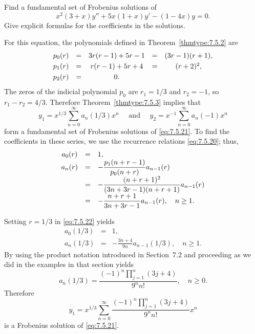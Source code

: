 \begin{example}
  \label{example:7.5.2}\rm Find a fundamental set of Frobenius solutions of
  \begin{equation}
    \label{eq:7.5.21}x^{2}(3+x)y''+5x(1+x)y'-(1-4x)y=0.
  \end{equation}
  Give explicit formulas for the coefficients in the solutions.
\end{example}

\begin{examplesolution}
\solution For this equation, the polynomials defined in Theorem~\ref{thmtype:7.5.2} are
\[
  \begin{array}{ccccc}
    p_{0}(r) & = & 3r(r-1)+5r-1 & = & (3r-1)(r+1), \\[1\jot]
    p_{1}(r) & = & r(r-1)+5r+4  & = & (r+2)^{2},   \\[1\jot]
    p_{2}(r) & = & 0.
  \end{array}
\]
The zeros of the indicial polynomial $p_{0}$ are $r_{1}=1/3$ and $r_{2}=-1$, so $r_{1}-r_{2}=4/3$.
Therefore Theorem~\ref{thmtype:7.5.3} implies that
\[
  y_{1}=x^{1/3}\sum_{n=0}^{\infty}a_{n}(1/3)x^{n}\quad\mbox{ and }\quad y_{2}=x^{-1}\sum_{n=0}^{\infty}a_{n}(-1)x^{n}
\]
form a fundamental set of Frobenius solutions of \eqref{eq:7.5.21}. To find the coefficients in
these series, we use the recurrence relations \eqref{eq:7.5.20}; thus,
\begin{equation}
  \label{eq:7.5.22}
  \begin{array}{ccl}
    a_{0}(r) & = & 1,                                                  \\
    a_{n}(r) & = & -\displaystyle\frac{p_{1}(n+r-1)}{p_{0}(n+r)}a_{n-1}(r)      \\[2\jot]
             & = & -\displaystyle\frac{(n+r+1)^{2}}{(3n+3r-1)(n+r+1)}a_{n-1}(r) \\[2\jot]
             & = & -\displaystyle\frac{n+r+1}{3n+3r-1}a_{n-1}(r),\quad n\ge1.
  \end{array}
\end{equation}

Setting $r=1/3$ in \eqref{eq:7.5.22} yields
\begin{eqnarray*}
  a_{0}(1/3) & = & 1, \\
  a_{n}(1/3) & = & -\frac{3n+4}{9n}a_{n-1}(1/3),\quad n\ge1.
\end{eqnarray*}
By using the product notation introduced in Section~7.2 and proceeding as we did in the examples in
that section yields
\[
  a_{n}(1/3)=\frac{(-1)^{n}\prod_{j=1}^{n}(3j+4)}{9^{n}n!},\quad n\ge0.
\]
Therefore
\[
  y_{1}=x^{1/3}\sum_{n=0}^{\infty}\frac{(-1)^{n}\prod_{j=1}^{n}(3j+4)}{9^{n}n!}x^{n}
\]
is a Frobenius solution of \eqref{eq:7.5.21}.


\end{examplesolution}
